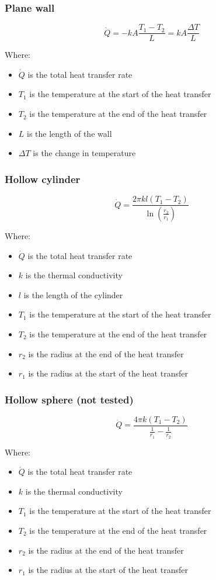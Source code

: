 \documentclass[11pt]{article}
\begin{document}
\subsubsection{Plane wall}
\label{sec:orgdae6eee}
\[\dot{Q} = -kA \frac{T_1 - T_2}{L} = kA \frac{\Delta T}{L}\]

Where:
\begin{itemize}
\item \(\dot{Q}\) is the total heat transfer rate
\item \(T_1\) is the temperature at the start of the heat transfer
\item \(T_2\) is the temperature at the end of the heat transfer
\item \(L\) is the length of the wall
\item \(\Delta T\) is the change in temperature
\end{itemize}

\subsubsection{Hollow cylinder}
\label{sec:org8f28a58}
\[\dot{Q} = \frac{2 \pi kl (T_1 - T_2)}{\ln \left(\frac{r_2}{r_1} \right)}\]

Where:
\begin{itemize}
\item \(\dot{Q}\) is the total heat transfer rate
\item \(k\) is the thermal conductivity
\item \(l\) is the length of the cylinder
\item \(T_1\) is the temperature at the start of the heat transfer
\item \(T_2\) is the temperature at the end of the heat transfer
\item \(r_2\) is the radius at the end of the heat transfer
\item \(r_1\) is the radius at the start of the heat transfer
\end{itemize}

 \newpage

\subsubsection{Hollow sphere (not tested)}
\label{sec:orga1a6c7f}
\[\dot{Q} = \frac{4 \pi k (T_1 - T_2)}{\frac{1}{r_1} - \frac{1}{r_2}}\]

Where:
\begin{itemize}
\item \(\dot{Q}\) is the total heat transfer rate
\item \(k\) is the thermal conductivity
\item \(T_1\) is the temperature at the start of the heat transfer
\item \(T_2\) is the temperature at the end of the heat transfer
\item \(r_2\) is the radius at the end of the heat transfer
\item \(r_1\) is the radius at the start of the heat transfer
\end{itemize}
\end{document}
